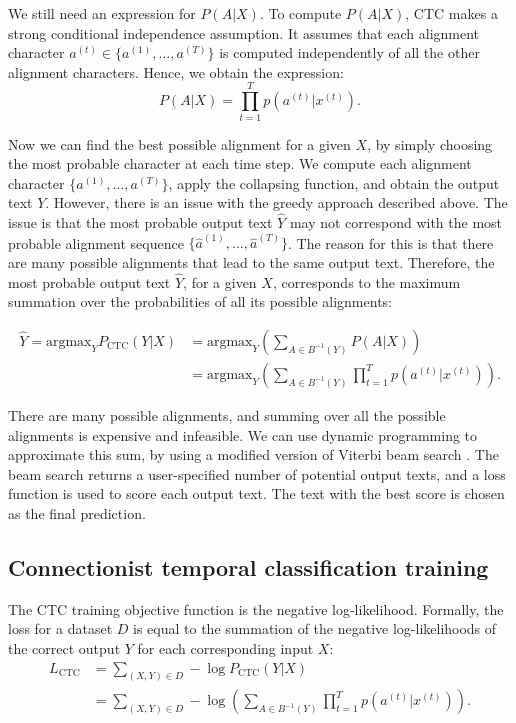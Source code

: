 We still need an expression for $P(A|X)$.
To compute $P(A|X)$, CTC makes a strong conditional independence assumption. 
It assumes that each alignment character $a^{(t)} \in \{a^{(1)}, \dots, a^{(T)}\}$ 
is computed independently of all the other alignment characters.
Hence, we obtain the expression:
\begin{equation}
    P(A|X) = \prod\limits_{t=1}^{T} p(a^{(t)} | x^{(t)}).
\end{equation}

Now we can find the best possible alignment for a given $X$, by simply choosing the most probable character at each time step.
We compute each alignment character $\{a^{(1)}, \dots, a^{(T)}\}$, apply the collapsing function, and obtain the output text $Y$.
However, there is an issue with the greedy approach described above. 
The issue is that the most probable output text $\hat{Y}$ may not correspond
with the most probable alignment sequence $\{\hat{a}^{(1)}, \dots, \hat{a}^{(T)}\}$.
The reason for this is that there are many possible alignments that lead to the same
output text. Therefore, the most probable output text $\hat{Y}$, for a given $X$, corresponds to the maximum summation over the probabilities of all its
possible alignments:

\begin{align}
    \hat{Y} = \text{argmax}_Y P_{\text{CTC}}(Y|X) &= \text{argmax}_Y \left(\sum\limits_{A \in B^{-1}(Y)} P(A|X)\right) \\
                                                               &= \text{argmax}_Y \left(\sum\limits_{A \in B^{-1}(Y)} \prod\limits_{t=1}^{T} p(a^{(t)} | x^{(t)})\right).
\end{align}

There are many possible alignments, and summing over all the possible alignments is expensive and infeasible.
We can use dynamic programming to approximate this sum, by using a modified version of Viterbi beam search \cite{hannun2017sequence}. 
The beam search returns a user-specified number of potential output texts, 
and a loss function is used to score each output text.
The text with the best score is chosen as the final prediction.

\subsection{Connectionist temporal classification training}
The CTC training objective function is the negative log-likelihood.
Formally, the loss for a dataset $D$ is equal to the summation of the negative log-likelihoods 
of the correct output $Y$ for each corresponding input $X$:
\begin{align}
    L_{\text{CTC}} &= \sum_{(X,Y) \in D} -\log P_{\text{CTC}}(Y|X) \\
                    &= \sum_{(X,Y) \in D} -\log \left( \sum_{A \in B^{-1}(Y)} \prod_{t=1}^{T} p(a^{(t)} | x^{(t)}) \right).
\end{align}

